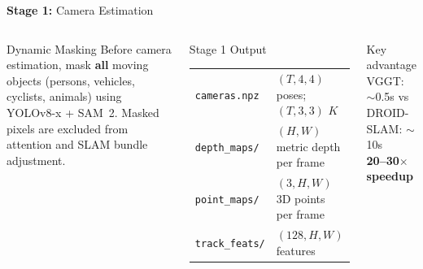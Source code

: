\documentclass[aspectratio=169,11pt]{beamer}
\newcommand{\stage}[2]{\textcolor{accentblue}{\textbf{Stage #1:}} #2}
\begin{document}
\begin{frame}{\stage{1}{Camera Estimation}}
\begin{columns}[T]
      \begin{block}{Dynamic Masking}
        \small Before camera estimation, mask \textbf{all} moving objects
        (persons, vehicles, cyclists, animals) using YOLOv8-x + SAM~2.
        Masked pixels are excluded from attention and SLAM bundle adjustment.
      \end{block}
      \vspace{0.5em}
      \begin{block}{Stage 1 Output}
        \footnotesize
        \begin{tabular}{ll}
          \texttt{cameras.npz} & $(T,4,4)$ poses; $(T,3,3)$ $K$\\
          \texttt{depth\_maps/} & $(H,W)$ metric depth per frame\\
          \texttt{point\_maps/} & $(3,H,W)$ 3D points per frame\\
          \texttt{track\_feats/} & $(128,H,W)$ features\\
        \end{tabular}
      \end{block}
      \vspace{0.5em}
      \begin{alertblock}{Key advantage}
        \small VGGT: $\sim$0.5s \hspace{1em} vs \hspace{1em} DROID-SLAM: $\sim$10s\\
        \textbf{20--30$\times$ speedup}
      \end{alertblock}
  \end{columns}
\end{frame}
\end{document}
